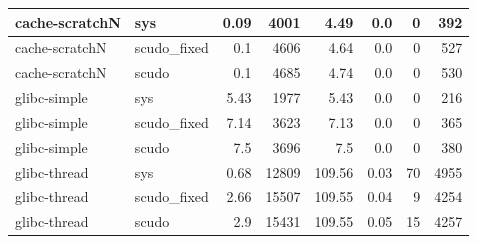 \documentclass[a4paper,11pt,oneside]{report}
\begin{document}
\begin{longtable}[h]{l l r r r r r r}
  \midrule
  cache-scratchN & sys & 0.09 & 4001 & 4.49 & 0.0 & 0 & 392 \\
  \midrule
  cache-scratchN & scudo\_fixed & 0.1 & 4606 & 4.64 & 0.0 & 0 & 527 \\
  \midrule
  cache-scratchN & scudo & 0.1 & 4685 & 4.74 & 0.0 & 0 & 530 \\
  \midrule
  glibc-simple & sys & 5.43 & 1977 & 5.43 & 0.0 & 0 & 216 \\
  \midrule
  glibc-simple & scudo\_fixed & 7.14 & 3623 & 7.13 & 0.0 & 0 & 365 \\
  \midrule
  glibc-simple & scudo & 7.5 & 3696 & 7.5 & 0.0 & 0 & 380 \\
  \midrule
  glibc-thread & sys & 0.68 & 12809 & 109.56 & 0.03 & 70 & 4955 \\
  \midrule
  glibc-thread & scudo\_fixed & 2.66 & 15507 & 109.55 & 0.04 & 9 & 4254 \\
  \midrule
  glibc-thread & scudo & 2.9 & 15431 & 109.55 & 0.05 & 15 & 4257 \\
  \bottomrule
\end{longtable}
\end{document}
